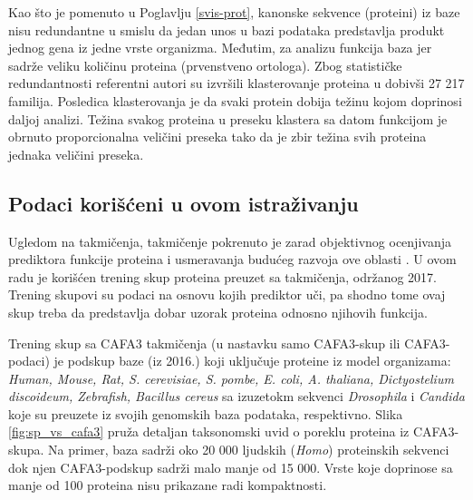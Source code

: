 Kao što je pomenuto u Poglavlju \ref{svis-prot}, kanonske sekvence (proteini) iz baze \swissprot
nisu redundantne u smislu da jedan unos u bazi podataka predstavlja produkt
jednog gena iz jedne vrste organizma. Međutim, za analizu funkcija baza
\swissprot {} \parencite{Xie2007} jer
sadrže veliku količinu  proteina (prvenstveno ortologa).
Zbog statističke redundantnosti referentni autori su izvršili klasterovanje \swissprot
proteina u  dobivši 27 217 familija. Posledica
klasterovanja je da svaki protein dobija težinu kojom doprinosi daljoj analizi.
Težina svakog proteina u preseku klastera sa datom funkcijom je obrnuto
proporcionalna veličini preseka tako da je zbir težina svih proteina jednaka
veličini preseka.

%

\subsection{Podaci korišćeni u ovom istraživanju}

Ugledom na  takmičenja,   takmičenje pokrenuto je zarad objektivnog ocenjivanja
prediktora funkcije proteina i usmeravanja budućeg razvoja ove oblasti
\parencite{CAFA}.  U ovom radu je korišćen trening skup proteina preuzet sa
 takmičenja, održanog 2017. Trening skupovi su podaci na osnovu
kojih prediktor uči, pa shodno tome ovaj skup treba da predstavlja dobar uzorak
proteina odnosno njihovih funkcija.


Trening skup sa CAFA3 takmičenja (u nastavku samo CAFA3-skup ili CAFA3-podaci) je podskup baze \swissprot (iz 2016.) koji
uključuje proteine iz model organizama: \textit{Human, Mouse, Rat, S.
cerevisiae, S. pombe, E. coli, A. thaliana, Dictyostelium discoideum,
Zebrafish, Bacillus cereus} sa izuzetokm sekvenci \textit{Drosophila} i \textit{Candida}
koje su preuzete iz svojih genomskih baza podataka, respektivno.
Slika \ref{fig:sp_vs_cafa3} pruža detaljan taksonomski uvid o poreklu proteina iz CAFA3-skupa.
Na primer, baza \swissprot sadrži oko 20 000 ljudskih (\textit{Homo})
proteinskih sekvenci dok njen CAFA3-podskup sadrži malo manje od 15 000.  Vrste
koje doprinose sa manje od 100 proteina nisu prikazane radi kompaktnosti.

